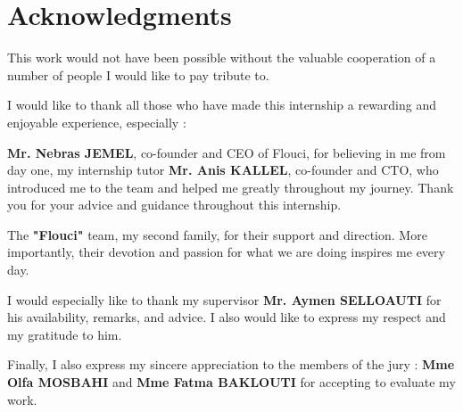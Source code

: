 \chapter*{Acknowledgments}

This work would not have been possible without the valuable cooperation of a number of people I would like to pay tribute to.\newline

I would like to thank all those who have made this internship a rewarding and enjoyable experience, especially :\newline

\textbf{Mr. Nebras JEMEL}, co-founder and CEO of Flouci, for believing in me from day one, my internship tutor \textbf{Mr. Anis KALLEL}, co-founder and CTO, who introduced me to the team and helped me greatly throughout my journey. Thank you for your advice and guidance throughout this internship. \newline

The \textbf{"Flouci"} team, my second family, for their support and direction. More importantly, their devotion and passion for what we are doing inspires me every day.\newline

I would especially like to thank my supervisor \textbf{Mr. Aymen SELLOAUTI} for his availability, remarks, and advice. I also would like to express my respect and my gratitude to him.\newline

Finally, I also express my sincere appreciation to the members of the jury : \textbf{Mme Olfa MOSBAHI} and \textbf{Mme Fatma BAKLOUTI} for accepting to evaluate my work.
